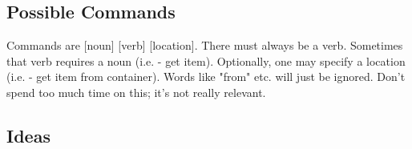 \documentclass{article}
\begin{document}
\subsection*{Possible Commands}

Commands are [noun] [verb] [location]. There must always be a verb. 
Sometimes that verb requires a noun (i.e. - get item). 
Optionally, one may specify a location (i.e. - get item from 
container). Words like "from" etc. will just be ignored. Don't spend 
too much time on this; it's not really relevant.

\bigskip
\bigskip

\hline 

\subsection*{Ideas}
\end{document}
